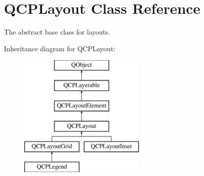 \hypertarget{classQCPLayout}{}\section{Q\+C\+P\+Layout Class Reference}
\label{classQCPLayout}


The abstract base class for layouts.  


Inheritance diagram for Q\+C\+P\+Layout\+:\begin{figure}[H]
\begin{center}
\leavevmode
\includegraphics[height=6.000000cm]{classQCPLayout}
\end{center}
\end{figure}
